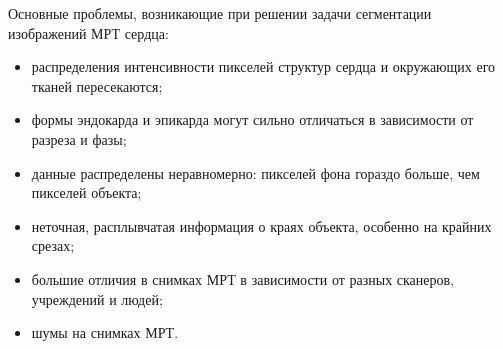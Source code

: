 Основные проблемы, возникающие при решении задачи сегментации изображений МРТ сердца:

\begin{itemize}
  \item распределения интенсивности пикселей структур сердца и окружающих его тканей пересекаются;
  \item формы эндокарда и эпикарда могут сильно отличаться в зависимости от разреза и фазы;
  \item данные распределены неравномерно: пикселей фона гораздо больше, чем пикселей объекта;
  \item неточная, расплывчатая информация о краях объекта, особенно на крайних срезах;
  \item большие отличия в снимках МРТ в зависимости от разных сканеров, учреждений и людей;
  \item шумы на снимках МРТ.
\end{itemize}


